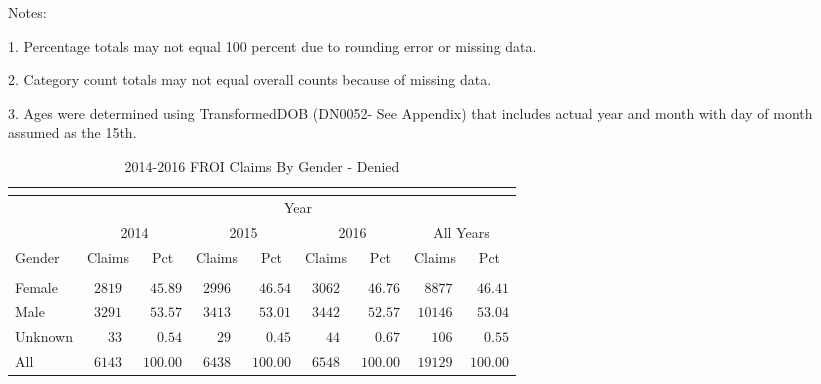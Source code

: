 \documentclass[9pt, oneside]{article}   	%
\begin{document}
    \begin{tablenotes}
      \small
      Notes:\\
      \item 1. Percentage totals may not equal 100 percent due to rounding error or missing data.\\
      \item 2. Category count totals may not equal overall counts because of missing data.\\
      \item 3. Ages were determined using TransformedDOB (DN0052- See Appendix) that includes actual year and month with day of month assumed as the 15th.
      \end{tablenotes}


\pagebreak

\begin{longtable}{lcccccccc}
\caption{2014-2016 FROI Claims By Gender - Denied}\\
\label{Table: Six.Denied}\\
\hline
                  \toprule
 & \multicolumn{8}{c}{Year} \\ 
 & \multicolumn{2}{c}{2014} & \multicolumn{2}{c}{2015} & \multicolumn{2}{c}{2016} & \multicolumn{2}{c}{All Years} \\ 
Gender  & Claims & Pct & Claims & Pct & Claims & Pct & Claims & \multicolumn{1}{c}{Pct} \\ 
\midrule\\ [-1\normalbaselineskip]\hline\endhead\hline\endfoot
Female  & $2819$ & $\phantom{0}45.89$ & $2996$ & $\phantom{0}46.54$ & $3062$ & $\phantom{0}46.76$ & $\phantom{0}8877$ & $\phantom{0}46.41$ \\
Male  & $3291$ & $\phantom{0}53.57$ & $3413$ & $\phantom{0}53.01$ & $3442$ & $\phantom{0}52.57$ & $10146$ & $\phantom{0}53.04$ \\
Unknown  & $\phantom{00}33$ & $\phantom{00}0.54$ & $\phantom{00}29$ & $\phantom{00}0.45$ & $\phantom{00}44$ & $\phantom{00}0.67$ & $\phantom{00}106$ & $\phantom{00}0.55$ \\
\cline{1-1} \cline{2-2} \cline{3-3} \cline{4-4} \cline{5-5} \cline{6-6} \cline{7-7} \cline{8-8} \cline{9-9}%
All  & $6143$ & $100.00$ & $6438$ & $100.00$ & $6548$ & $100.00$ & $19129$ & $100.00$ \\
\hline 
\end{longtable}


\pagebreak
\end{document}
